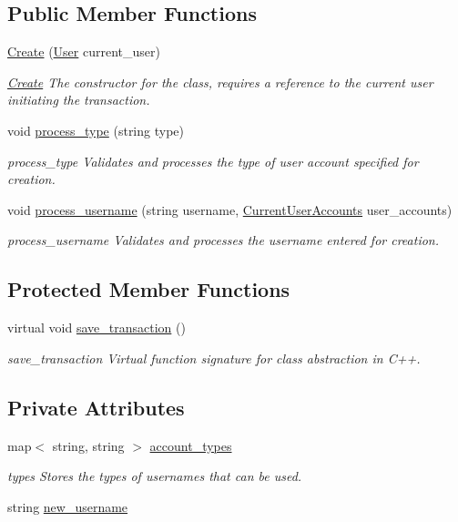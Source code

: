 \subsection*{Public Member Functions}
\begin{DoxyCompactItemize}
\item 
\hyperlink{class_create_ada40d6dcc7cdbbc9455c966e496c12d1}{Create} (\hyperlink{class_user}{User} current\-\_\-user)
\begin{DoxyCompactList}\small\item\em \hyperlink{class_create}{Create} The constructor for the class, requires a reference to the current user initiating the transaction. \end{DoxyCompactList}\item 
void \hyperlink{class_create_aae29977b8b574eedac47b2ca017731d9}{process\-\_\-type} (string type)
\begin{DoxyCompactList}\small\item\em process\-\_\-type Validates and processes the type of user account specified for creation. \end{DoxyCompactList}\item 
void \hyperlink{class_create_ac47c27071fa4977b64633b429f2d8bc0}{process\-\_\-username} (string username, \hyperlink{class_current_user_accounts}{Current\-User\-Accounts} user\-\_\-accounts)
\begin{DoxyCompactList}\small\item\em process\-\_\-username Validates and processes the username entered for creation. \end{DoxyCompactList}\end{DoxyCompactItemize}
\subsection*{Protected Member Functions}
\begin{DoxyCompactItemize}
\item 
virtual void \hyperlink{class_create_a8e5996ad33eb07eef44f55deba6c298e}{save\-\_\-transaction} ()
\begin{DoxyCompactList}\small\item\em save\-\_\-transaction Virtual function signature for class abstraction in C++. \end{DoxyCompactList}\end{DoxyCompactItemize}
\subsection*{Private Attributes}
\begin{DoxyCompactItemize}
\item 
map$<$ string, string $>$ \hyperlink{class_create_aa1c31e633ab706568edf84799ed3ca54}{account\-\_\-types}
\begin{DoxyCompactList}\small\item\em types Stores the types of usernames that can be used. \end{DoxyCompactList}\item 
string \hyperlink{class_create_a19ae5348081200db2e186a7045be5112}{new\-\_\-username}
\end{DoxyCompactItemize}
